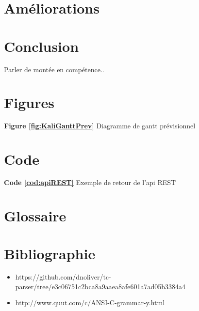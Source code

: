 \documentclass{article}
\begin{document}
	
	
	
	\section{Améliorations}
	
	\section{Conclusion}
	
	Parler de montée en compétence..
	
	
	\section*{Figures}
\indent
\textbf{Figure \ref{fig:KaliGanttPrev}} Diagramme de gantt prévisionnel\\
\indent

\section*{Code}

\indent
\textbf{Code \ref{cod:apiREST}} Exemple de retour de l'api REST\\
\indent

    


\section*{Glossaire}
\renewcommand{\glossarysection}[2][]{}

\printglossary[title=List of Terms,toctitle=Terms and abbreviations]



\section*{Bibliographie}
\begin{itemize}

\item https://github.com/dnoliver/tc-parser/tree/e3c06751c2bca8a9aaea8afe601a7ad05b3384a4
\item http://www.quut.com/c/ANSI-C-grammar-y.html

\end{itemize}
	
\end{document}
